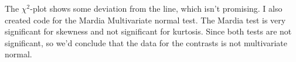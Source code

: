 \begin{enumerate}[label= (\alph*)]
   The $\chi^{2}$-plot shows some deviation from the line, which isn't promising.
    I also created code for the Mardia Multivariate normal test.
    The Mardia test is very significant for skewness and not significant for kurtosis.
    Since both tests are not significant, so we'd conclude that the data for the contrasts is not multivariate normal.
    
\end{enumerate}
